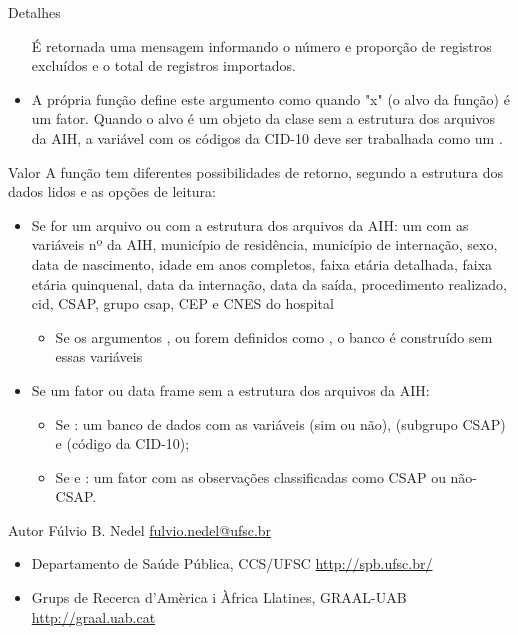 \documentclass[letterpaper]{book}
\begin{document}
\begin{Section}{Detalhes}
\begin{itemize}
É retornada uma mensagem informando o número e proporção de registros excluídos e o total de registros importados.

\item {}   A própria função define este argumento como  quando "x" (o alvo da função) é um fator. Quando o alvo é um objeto da clase  sem a estrutura dos arquivos da AIH, a variável com os códigos da CID-10 deve ser trabalhada como um . 

\end{itemize}
 
\end{Section}
%
\begin{Section}{Valor}
A função tem diferentes possibilidades de retorno, segundo a estrutura dos dados lidos e as opções de leitura:
\begin{itemize}
\item  Se for um arquivo ou  com a estrutura dos arquivos da AIH: um  com as variáveis nº da AIH, município de residência, município de internação, sexo, data de nascimento, idade em anos completos, faixa etária detalhada, faixa etária quinquenal, data da internação, data da saída, procedimento realizado, cid, CSAP, grupo csap, CEP e CNES do hospital
	\begin{itemize}
		\item Se os argumentos ,  ou  forem definidos como , o banco é construído sem essas variáveis
	\end{itemize}
\item Se um fator ou data frame sem a estrutura dos arquivos da AIH:
	\begin{itemize}
	\item Se :  um banco de dados com as variáveis  (sim ou não),  (subgrupo CSAP) e  (código da CID-10);
	\item Se  e :  um fator com as observações classificadas como CSAP ou não-CSAP.    
	\end{itemize}
\end{itemize}
\end{Section}
%
\begin{Section}{Autor}
Fúlvio B. Nedel \href{mailto:fulvio.nedel@ufsc.br}{fulvio.nedel@ufsc.br}
\begin{itemize}
\item Departamento de Saúde Pública, CCS/UFSC
\url{http://spb.ufsc.br/}
\item Grups de Recerca d'Amèrica i Àfrica Llatines, GRAAL-UAB
\url{http://graal.uab.cat}
\end{itemize}
\end{Section}
\end{document}
